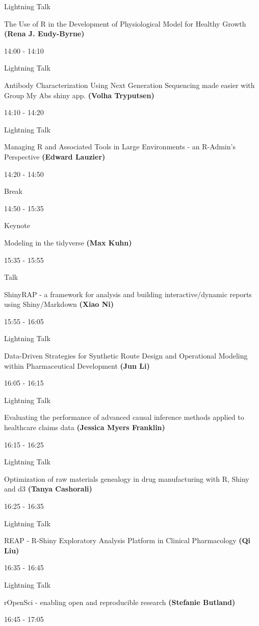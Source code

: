 \documentclass[]{book}
\theoremstyle{definition}
\theoremstyle{definition}
\theoremstyle{definition}
\theoremstyle{remark}
\begin{document}
Lightning Talk

The Use of R in the Development of Physiological Model for Healthy
Growth \textbf{(Rena J. Eudy-Byrne)}

14:00 - 14:10

Lightning Talk

Antibody Characterization Using Next Generation Sequencing made easier
with Group My Abs shiny app. \textbf{(Volha Tryputsen)}

14:10 - 14:20

Lightning Talk

Managing R and Associated Tools in Large Environments - an R-Admin's
Perspective \textbf{(Edward Lauzier)}

14:20 - 14:50

Break

14:50 - 15:35

Keynote

Modeling in the tidyverse \textbf{(Max Kuhn)}

15:35 - 15:55

Talk

ShinyRAP - a framework for analysis and building interactive/dynamic
reports using Shiny/Markdown \textbf{(Xiao Ni)}

15:55 - 16:05

Lightning Talk

Data-Driven Strategies for Synthetic Route Design and Operational
Modeling within Pharmaceutical Development \textbf{(Jun Li)}

16:05 - 16:15

Lightning Talk

Evaluating the performance of advanced causal inference methods applied
to healthcare claims data \textbf{(Jessica Myers Franklin)}

16:15 - 16:25

Lightning Talk

Optimization of raw materials genealogy in drug manufacturing with R,
Shiny and d3 \textbf{(Tanya Cashorali)}

16:25 - 16:35

Lightning Talk

REAP - R-Shiny Exploratory Analysis Platform in Clinical Pharmacology
\textbf{(Qi Liu)}

16:35 - 16:45

Lightning Talk

rOpenSci - enabling open and reproducible research \textbf{(Stefanie
Butland)}

16:45 - 17:05
\end{document}
